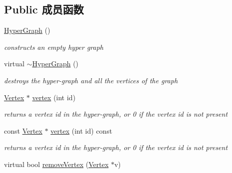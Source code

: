 \subsection*{Public 成员函数}
\begin{DoxyCompactItemize}
\item 
\hypertarget{classg2o_1_1HyperGraph_a833632b111cfc7cf08b842ae3cb43d41}{\hyperlink{classg2o_1_1HyperGraph_a833632b111cfc7cf08b842ae3cb43d41}{Hyper\-Graph} ()}\label{classg2o_1_1HyperGraph_a833632b111cfc7cf08b842ae3cb43d41}

\begin{DoxyCompactList}\small\item\em constructs an empty hyper graph \end{DoxyCompactList}\item 
\hypertarget{classg2o_1_1HyperGraph_a0ef6e1d65e0f9171a518bce3fc559693}{virtual \hyperlink{classg2o_1_1HyperGraph_a0ef6e1d65e0f9171a518bce3fc559693}{$\sim$\-Hyper\-Graph} ()}\label{classg2o_1_1HyperGraph_a0ef6e1d65e0f9171a518bce3fc559693}

\begin{DoxyCompactList}\small\item\em destroys the hyper-\/graph and all the vertices of the graph \end{DoxyCompactList}\item 
\hypertarget{classg2o_1_1HyperGraph_ab07fe8bd9982a66ba34e83dff8317ea2}{\hyperlink{classg2o_1_1HyperGraph_1_1Vertex}{Vertex} $\ast$ \hyperlink{classg2o_1_1HyperGraph_ab07fe8bd9982a66ba34e83dff8317ea2}{vertex} (int id)}\label{classg2o_1_1HyperGraph_ab07fe8bd9982a66ba34e83dff8317ea2}

\begin{DoxyCompactList}\small\item\em returns a vertex {\itshape id} in the hyper-\/graph, or 0 if the vertex id is not present \end{DoxyCompactList}\item 
\hypertarget{classg2o_1_1HyperGraph_a685a30debc0c540cc10c1bfc669ad2f1}{const \hyperlink{classg2o_1_1HyperGraph_1_1Vertex}{Vertex} $\ast$ \hyperlink{classg2o_1_1HyperGraph_a685a30debc0c540cc10c1bfc669ad2f1}{vertex} (int id) const }\label{classg2o_1_1HyperGraph_a685a30debc0c540cc10c1bfc669ad2f1}

\begin{DoxyCompactList}\small\item\em returns a vertex {\itshape id} in the hyper-\/graph, or 0 if the vertex id is not present \end{DoxyCompactList}\item 
\hypertarget{classg2o_1_1HyperGraph_a97ab8302aa027d513253387bba9e0dd5}{virtual bool \hyperlink{classg2o_1_1HyperGraph_a97ab8302aa027d513253387bba9e0dd5}{remove\-Vertex} (\hyperlink{classg2o_1_1HyperGraph_1_1Vertex}{Vertex} $\ast$v)}\label{classg2o_1_1HyperGraph_a97ab8302aa027d513253387bba9e0dd5}


\end{DoxyCompactItemize}
